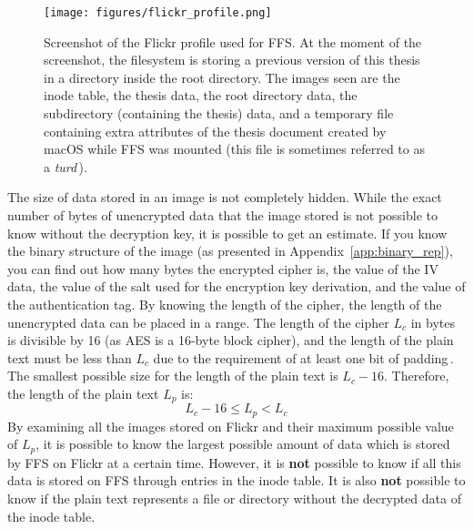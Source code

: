 \begin{figure}[!h]
	\begin{center}
	  \texttt{[image: figures/flickr\_profile.png]}
	\end{center}
	\caption[Screenshot of the Flickr profile used for \gls{FFS}]{Screenshot of the Flickr profile used for \gls{FFS}. At the moment of the screenshot, the filesystem is storing a previous version of this thesis in a directory inside the root directory. The images seen are the inode table, the thesis data, the root directory data, the subdirectory (containing the thesis) data, and a temporary file containing extra attributes of the thesis document created by macOS while \gls{FFS} was mounted (this file is sometimes referred to as a \textit{turd}\,\cite{geekosaurAnswerWhyAre2011}).}
	\label{fig:flickr_profile}
\end{figure}

The size of data stored in an image is not completely hidden. While the exact number of bytes of unencrypted data that the image stored is not possible to know without the decryption key, it is possible to get an estimate. If you know the binary structure of the image (as presented in Appendix~\ref{app:binary_rep}), you can find out how many bytes the encrypted cipher is, the value of the \gls{IV} data, the value of the salt used for the encryption key derivation, and the value of the authentication tag. By knowing the length of the cipher, the length of the unencrypted data can be placed in a range. The length of the cipher $L_c$ in bytes is divisible by 16 (as \gls{AES} is a \mbox{16-byte} block cipher), and the length of the plain text must be less than $L_c$ due to the requirement of at least one bit of padding\,\cite{z.z.coderAnswerSizeData2010}. The smallest possible size for the length of the plain text is $L_c - 16$. Therefore, the length of the plain text $L_p$ is:
$$
	L_c - 16 \leq L_p < L_c
$$
By examining all the images stored on Flickr and their maximum possible value of $L_p$, it is possible to know the largest possible amount of data which is stored by \gls{FFS} on Flickr at a certain time. However, it is \textbf{not} possible to know if all this data is stored on \gls{FFS} through entries in the inode table. It is also \textbf{not} possible to know if the plain text represents a file or directory without the decrypted data of the inode table.


